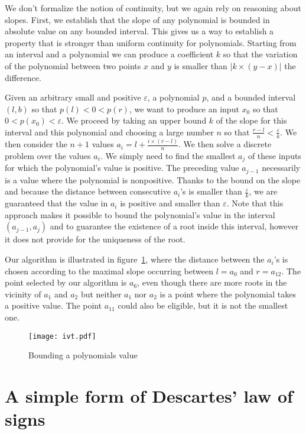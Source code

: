 \documentclass{article}
\begin{document}
We don't formalize the notion of continuity, but we again rely on
reasoning about slopes. First, we establish that the slope of any
polynomial is bounded in absolute value on any bounded interval. This
gives us a way to establish a property that is stronger than uniform
continuity for polynomials. Starting from an interval and a polynomial
we can produce a coefficient \(k\) so that the variation of the
polynomial between two points \(x\) and \(y\) is smaller than
\(|k\times(y-x)|\) the difference.

Given an arbitrary small and positive \(\varepsilon\), a polynomial
\(p\), and a bounded interval \((l,b)\) so that \(p(l) < 0 < p(r)\),
we want to produce an input \(x_0\) so that \(0 < p(x_0) <
\varepsilon\).  We proceed by taking an upper bound \(k\) of the slope for
this interval and this polynomial and choosing a large number \(n\) so
that \(\frac{r-l}{n} < \frac{\varepsilon}{k}\).  We then consider the
\(n+1\) values \(a_i =l + \frac{i\times (r-l)}{n}\). We then solve a
discrete problem over the values \(a_i\). We simply need to find the
smallest \(a_j\) of these inputs for which the polynomial's value is
positive. The preceding value \(a_{j-1}\) necessarily is a value where
the polynomial is nonpositive. Thanks to the bound on the slope and
because the distance between consecutive \(a_i\)'s is smaller than
\(\frac{\varepsilon}{k}\), we are guaranteed that the value in \(a_i\)
is positive and smaller than \(\varepsilon\).  Note that this approach
makes it possible to bound the polynomial's value in the interval
\((a_{j-1},a_j)\) and to guarantee the existence of a root inside this
interval, however it does not provide for the uniqueness of the root.

Our algorithm is illustrated in figure~\ref{ivt}, where the distance
between the \(a_i\)'s is chosen according to the maximal slope
occurring between \(l=a_0\) and \(r=a_{12}\). The point selected by
our algorithm is \(a_6\), even though there are more roots in the
vicinity of \(a_1\) and \(a_2\) but neither \(a_1\) nor \(a_2\) is a
point where the polynomial takes a positive value.  The point \(a_{11}\) could
also be eligible, but it is not the smallest one.
\begin{figure}
\label{ivt}
\begin{center}
\texttt{[image: ivt.pdf]}
\end{center}
\caption{Bounding a polynomials value}
\end{figure}

\section{A simple form of Descartes' law of signs}
\end{document}
